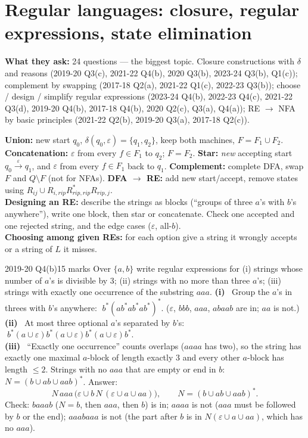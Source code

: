 \documentclass[10.5pt,a4paper]{article}
\newcommand{\asked}[1]{{\small\color{gray!60!black}\textbf{What they ask:} #1}\par}
\newcommand{\ansh}[1]{\textbf{\color{exborder}#1}\ }
\newcommand{\eps}{\varepsilon}
\begin{document}
\section{Regular languages: closure, regular expressions, state elimination}
\asked{24 questions --- the biggest topic. Closure constructions with $\delta$ and reasons (2019-20 Q3(c), 2021-22 Q4(b), 2020 Q3(b),
2023-24 Q3(b), Q1(c)); complement by swapping (2017-18 Q2(a), 2021-22 Q1(c), 2022-23 Q3(b)); choose / design / simplify regular expressions
(2023-24 Q4(b), 2022-23 Q4(c), 2021-22 Q3(d), 2019-20 Q4(b), 2017-18 Q4(b), 2020 Q2(c), Q3(a), Q4(a)); RE $\to$ NFA by basic principles
(2021-22 Q2(b), 2019-20 Q3(a), 2017-18 Q2(c)).}
\begin{recipe}
\textbf{Union:} new start $q_0$, $\delta(q_0,\eps)=\{q_1,q_2\}$, keep both machines, $F=F_1\cup F_2$.\quad
\textbf{Concatenation:} $\eps$ from every $f\in F_1$ to $q_2$; $F=F_2$.\quad
\textbf{Star:} \emph{new} accepting start $q_0\xrightarrow{\eps}q_1$, and $\eps$ from every $f\in F_1$ back to $q_1$.\quad
\textbf{Complement:} complete DFA, swap $F$ and $Q\setminus F$ (not for NFAs).\quad
\textbf{DFA $\to$ RE:} add new start/accept, remove states using $R_{ij}\cup R_{i,rip}R_{rip,rip}^*R_{rip,j}$.\\
\textbf{Designing an RE:} describe the strings as blocks (``groups of three $a$'s with $b$'s anywhere''), write one block, then star or
concatenate. Check one accepted and one rejected string, and the edge cases ($\eps$, all-$b$).\\
\textbf{Choosing among given REs:} for each option give a string it wrongly accepts or a string of $L$ it misses.
\end{recipe}

\begin{examq}{2019-20 Q4(b)}{15 marks}
Over $\{a,b\}$ write regular expressions for (i) strings whose number of $a$'s is divisible by 3; (ii) strings with no more than three $a$'s;
(iii) strings with exactly one occurrence of the substring $aaa$.
\tcblower
\ansh{(i)} Group the $a$'s in threes with $b$'s anywhere: $\;b^*(ab^*ab^*ab^*)^*$. ($\eps$, $bbb$, $aaa$, $abaab$ are in; $aa$ is not.)\\
\ansh{(ii)} At most three optional $a$'s separated by $b$'s: $\;b^*(a\cup\eps)b^*(a\cup\eps)b^*(a\cup\eps)b^*$.\\
\ansh{(iii)} ``Exactly one occurrence'' counts overlaps ($aaaa$ has two), so the string has exactly one maximal $a$-block of length exactly 3 and
every other $a$-block has length $\le2$. Strings with no $aaa$ that are empty or end in $b$: $N=(b\cup ab\cup aab)^*$. Answer:
\[N\,aaa\,\big(\eps\cup b\,N\,(\eps\cup a\cup aa)\big),\qquad N=(b\cup ab\cup aab)^*.\]
Check: $baaab$ ($N=b$, then $aaa$, then $b$) is in; $aaaa$ is not ($aaa$ must be followed by $b$ or the end); $aaabaaa$ is not (the part
after $b$ is in $N(\eps\cup a\cup aa)$, which has no $aaa$).
\end{examq}
\end{document}
